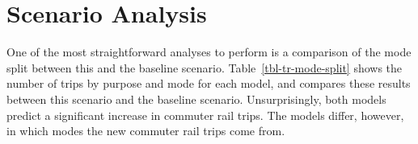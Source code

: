 \documentclass[fancy, twoside, mastersfancy, ms]{byuthesis}
\begin{document}
\section{Scenario Analysis}\label{scenario-analysis-1}

One of the most straightforward analyses to perform is a comparison of
the mode split between this and the baseline scenario.
Table~\ref{tbl-tr-mode-split} shows the number of trips by purpose and
mode for each model, and compares these results between this scenario
and the baseline scenario. Unsurprisingly, both models predict a
significant increase in commuter rail trips. The models differ, however,
in which modes the new commuter rail trips come from.

\begin{table}

\caption{\label{tbl-tr-mode-split}Change in Mode Split with Improved
Transit}

\end{table}
\end{document}
